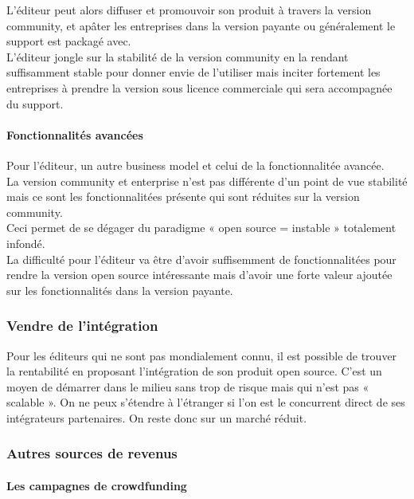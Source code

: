 					L'éditeur peut alors diffuser et promouvoir son produit à travers la version community, et apâter les entreprises dans la version payante ou généralement le support est packagé avec.\\

					L'éditeur jongle sur la stabilité de la version community en la rendant suffisamment stable pour donner envie de l'utiliser mais inciter fortement les entreprises à prendre la version sous licence commerciale qui sera accompagnée du support.

				\paragraph{Fonctionnalités avancées\\}

					Pour l'éditeur, un autre business model et celui de la fonctionnalitée avancée.\\
					La version community et enterprise n'est pas différente d'un point de vue stabilité mais ce sont les fonctionnalitées présente qui sont réduites sur la version community.\\

					Ceci permet de se dégager du paradigme « open source = instable » totalement infondé.\\

					La difficulté pour l'éditeur va être d'avoir suffisemment de fonctionnalitées pour rendre la version open source intéressante mais d'avoir une forte valeur ajoutée sur les fonctionnalités dans la version payante.

			\subsubsection{Vendre de l'intégration}

				Pour les éditeurs qui ne sont pas mondialement connu, il est possible de trouver la rentabilité en proposant l'intégration de son produit open source. C'est un moyen de démarrer dans le milieu sans trop de risque mais qui n'est pas « \gls{scalable} ». On ne peux s'étendre à l'étranger si l'on est le concurrent direct de ses intégrateurs partenaires. On reste donc sur un marché réduit.

			\subsubsection{Autres sources de revenus}

				\paragraph{Les campagnes de crowdfunding\\}

